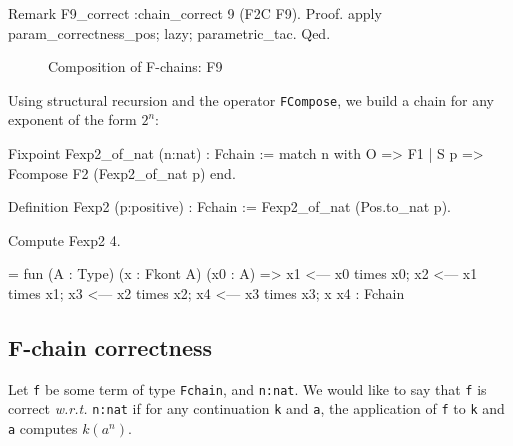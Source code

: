 \begin{Coqsrc}
Remark F9_correct :chain_correct 9 (F2C F9).
Proof.
  apply param_correctness_pos;  lazy;  parametric_tac.
Qed.
\end{Coqsrc}

\begin{figure}[h]
  \centering
  \caption{Composition  of F-chains: F9}
  \label{fig:F9}
\end{figure}

Using structural recursion and the operator \texttt{FCompose},
we build a chain for any exponent of the form $2^n$:

\begin{Coqsrc}
 Fixpoint  Fexp2_of_nat (n:nat) : Fchain :=
 match n with O => F1
            | S p => Fcompose F2 (Fexp2_of_nat p)
 end.


Definition Fexp2 (p:positive) : Fchain :=
  Fexp2_of_nat (Pos.to_nat p). 

Compute Fexp2  4.
\end{Coqsrc}

\begin{Coqanswer}
 = fun (A : Type) (x : Fkont A) (x0 : A) =>
       x1 <--- x0 times x0;
       x2 <--- x1 times x1; x3 <--- x2 times x2; 
       x4 <--- x3 times x3; x x4
     : Fchain
\end{Coqanswer}

\subsection{F-chain correctness}
Let \texttt{f} be some term of type \texttt{Fchain}, and \texttt{n:nat}.
We would like to say that \texttt{f} is correct \emph{w.r.t.} \texttt{n:nat}
if for any continuation \texttt{k} and \texttt{a}, the application of 
\texttt{f} to \texttt{k} and \texttt{a} computes \texttt{$k(a^n)$}.

